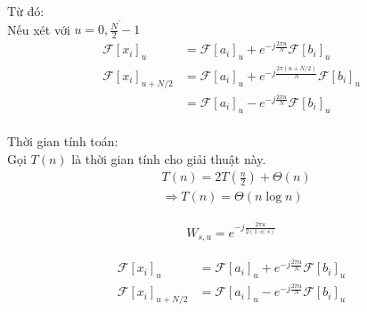 \documentclass[12pt]{report}
\begin{document}
\noindent Từ đó: \\
Nếu xét với $u = \overline{0, \frac{N}{2} - 1}$
\begin{align*}
    \mathcal{F}[x_i]_u &= \mathcal{F}[a_i]_u 
    + e^{-j\frac{2\pi u}{N}} \mathcal{F}[b_i]_u \\
    \mathcal{F}[x_i]_{u + N/2} &= \mathcal{F}[a_i]_u 
    + e^{-j\frac{2\pi (u + N/2)}{N}} \mathcal{F}[b_i]_u \\
    &= \mathcal{F}[a_i]_u 
    - e^{-j\frac{2\pi u}{N}} \mathcal{F}[b_i]_u
\end{align*}\\[1cm]

\noindent Thời gian tính toán:  \\
Gọi $T(n)$ là thời gian tính cho giải thuật này.
\begin{align*}
    &T\left(n\right) = 2 T\left(\frac{n}{2}\right) 
    + \Theta \left(n\right) \\
    &\Rightarrow T(n) = \Theta \left( n \log n\right)
\end{align*}

\begin{align*}
    W_{s, u} = e^{-j\frac{2\pi u}{2 (1 \ll s)}}
\end{align*}

\begin{align*}
    \mathcal{F}[x_i]_u &= \mathcal{F}[a_i]_u 
    + e^{-j\frac{2\pi u}{N}} \mathcal{F}[b_i]_u \\
    \mathcal{F}[x_i]_{u + N/2} &= \mathcal{F}[a_i]_u 
    - e^{-j\frac{2\pi u}{N}} \mathcal{F}[b_i]_u
\end{align*}\\[1cm]
\end{document}
